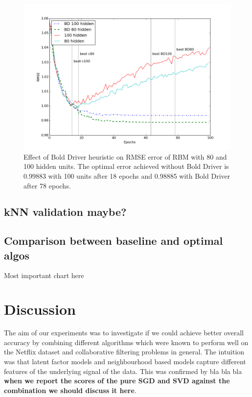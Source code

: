 \documentclass[10pt,conference,compsocconf]{IEEEtran}
\begin{document}
\begin{figure}[htbp]
  \centering
  \includegraphics[width=\columnwidth]{conv_rbm_all.png}
  \caption{Effect of Bold Driver heuristic on RMSE error of RBM with 80 and 100 hidden units. The optimal error achieved without Bold Driver is 0.99883 with 100 units after 18 epochs and 0.98885 with Bold Driver after 78 epochs.}
  \label{fig:rbm-conv-zoom}
\end{figure} 

\subsection{kNN validation maybe?}

\subsection{Comparison between baseline and optimal algos}
Most important chart here


\section{Discussion}
\label{sec:discussion}
The aim of our experiments was to investigate if we could achieve better overall accuracy by combining different algorithms which were known to perform well on the Netflix dataset and collaborative filtering problems in general. The intuition was that latent factor models and neighbourhood based models capture different features of the underlying signal of the data. This was confirmed by bla bla bla \textbf{when we report the scores  of the pure SGD and SVD against the combination we should discuss it here}. 
\end{document}
